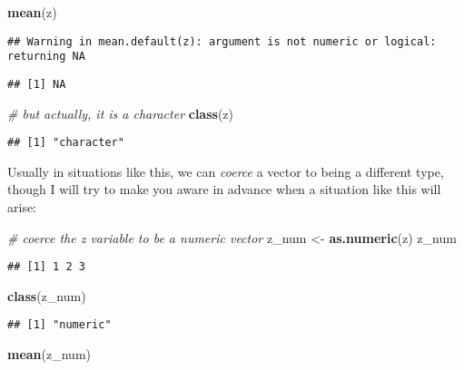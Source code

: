 \documentclass[
]{article}
\newenvironment{Shaded}{\begin{snugshade}}{\end{snugshade}}
\newcommand{\CommentTok}[1]{\textcolor[rgb]{0.56,0.35,0.01}{\textit{#1}}}
\newcommand{\FunctionTok}[1]{\textcolor[rgb]{0.13,0.29,0.53}{\textbf{#1}}}
\newcommand{\NormalTok}[1]{#1}
\newcommand{\OtherTok}[1]{\textcolor[rgb]{0.56,0.35,0.01}{#1}}
\begin{document}
\begin{Shaded}
\begin{Highlighting}[]
\FunctionTok{mean}\NormalTok{(z)}
\end{Highlighting}
\end{Shaded}

\begin{verbatim}
## Warning in mean.default(z): argument is not numeric or logical: returning NA
\end{verbatim}

\begin{verbatim}
## [1] NA
\end{verbatim}

\begin{Shaded}
\begin{Highlighting}[]
\CommentTok{\# but actually, it is a character}
\FunctionTok{class}\NormalTok{(z)}
\end{Highlighting}
\end{Shaded}

\begin{verbatim}
## [1] "character"
\end{verbatim}

Usually in situations like this, we can \emph{coerce} a vector to being
a different type, though I will try to make you aware in advance when a
situation like this will arise:

\begin{Shaded}
\begin{Highlighting}[]
\CommentTok{\# coerce the z variable to be a numeric vector}
\NormalTok{z\_num }\OtherTok{\textless{}{-}} \FunctionTok{as.numeric}\NormalTok{(z)}
\NormalTok{z\_num}
\end{Highlighting}
\end{Shaded}

\begin{verbatim}
## [1] 1 2 3
\end{verbatim}

\begin{Shaded}
\begin{Highlighting}[]
\FunctionTok{class}\NormalTok{(z\_num)}
\end{Highlighting}
\end{Shaded}

\begin{verbatim}
## [1] "numeric"
\end{verbatim}

\begin{Shaded}
\begin{Highlighting}[]
\FunctionTok{mean}\NormalTok{(z\_num)}
\end{Highlighting}
\end{Shaded}
\end{document}
